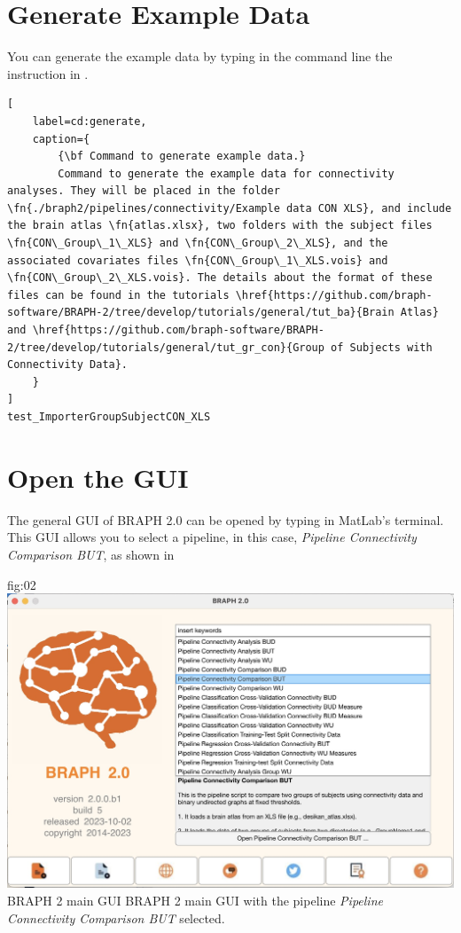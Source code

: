 \documentclass[justified]{tufte-handout}
\begin{document}
\tableofcontents

\clearpage
\section{Generate Example Data}

You can generate the example data by typing in the command line the instruction in .
%
\begin{lstlisting}[
	label=cd:generate,
	caption={
		{\bf Command to generate example data.}
		Command to generate the example data for connectivity analyses. They will be placed in the folder \fn{./braph2/pipelines/connectivity/Example data CON XLS}, and include the brain atlas \fn{atlas.xlsx}, two folders with the subject files \fn{CON\_Group\_1\_XLS} and \fn{CON\_Group\_2\_XLS}, and the associated covariates files \fn{CON\_Group\_1\_XLS.vois} and \fn{CON\_Group\_2\_XLS.vois}. The details about the format of these files can be found in the tutorials \href{https://github.com/braph-software/BRAPH-2/tree/develop/tutorials/general/tut_ba}{Brain Atlas} and \href{https://github.com/braph-software/BRAPH-2/tree/develop/tutorials/general/tut_gr_con}{Group of Subjects with Connectivity Data}.
	}
]
test_ImporterGroupSubjectCON_XLS
\end{lstlisting}

\section{Open the GUI}

The general GUI of BRAPH 2.0 can be opened by typing  in MatLab's terminal. This GUI allows you to select a pipeline, in this case, \emph{Pipeline Connectivity Comparison BUT}, as shown in 

	{fig:02}
	{
	\includegraphics{fig02.jpg}
	}
	{BRAPH 2 main GUI}
	{
	BRAPH 2 main GUI with the pipeline \emph{Pipeline Connectivity Comparison BUT} selected.
	}
\end{document}
